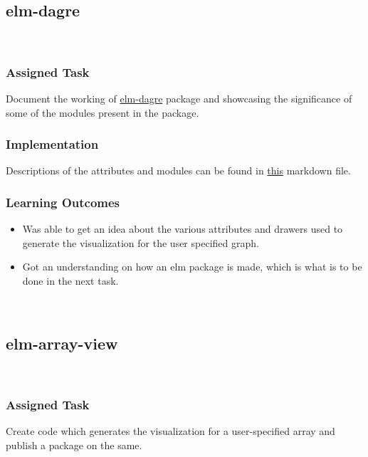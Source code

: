 \begin{FlushLeft}
\subsection{elm-dagre}
\\[0.1in]
\subsubsection{Assigned Task}
Document the working of \href{https://package.elm-lang.org/packages/goyalarchit/elm-dagre/}{elm-dagre} package and showcasing the significance of some of the modules present in the package. 
\\[0.5in]
\subsubsection{Implementation}
Descriptions of the attributes and modules can be found in \href{https://github.com/kmvolv/elm-dagre-task/blob/main/task.md}{this} markdown file. 
\\[0.5in]
\subsubsection{Learning Outcomes}
\begin{itemize}
    \item Was able to get an idea about the various attributes and drawers used to generate the visualization for the user specified graph.
    \item Got an understanding on how an elm package is made, which is what is to be done in the next task. 
\end{itemize}
\\[1in]
\subsection{elm-array-view}
\\[0.1in]
\subsubsection{Assigned Task}
Create code which generates the visualization for a user-specified array and publish a package on the same. 
\cleardoublepage

\end{FlushLeft}
